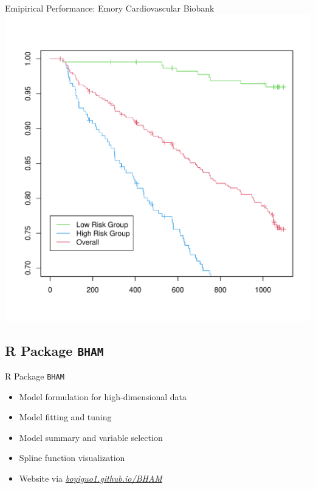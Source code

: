 \documentclass[
  ignorenonframetext,
  aspectratio=169]{beamer}
\providecommand{\tightlist}{%
  \setlength{\itemsep}{0pt}\setlength{\parskip}{0pt}}
\begin{document}
\begin{frame}{Emipirical Performance: Emory Cardiovascular Biobank}
\protect\hypertarget{emipirical-performance-emory-cardiovascular-biobank}{}
\includegraphics[width=\textwidth,height=0.6\textheight]{ECB_bcam_KM.pdf}
\end{frame}

\hypertarget{r-package-bham}{%
\subsection{\texorpdfstring{R Package
\texttt{BHAM}}{R Package BHAM}}\label{r-package-bham}}

\begin{frame}{R Package \texttt{BHAM}}
\begin{itemize}
\tightlist
\item
  Model formulation for high-dimensional data
\item
  Model fitting and tuning
\item
  Model summary and variable selection
\item
  Spline function visualization
\item
  Website via
  \href{https://boyiguo1.github.io/BHAM/}{\emph{boyiguo1.github.io/BHAM}}
\end{itemize}
\end{frame}
\end{document}
